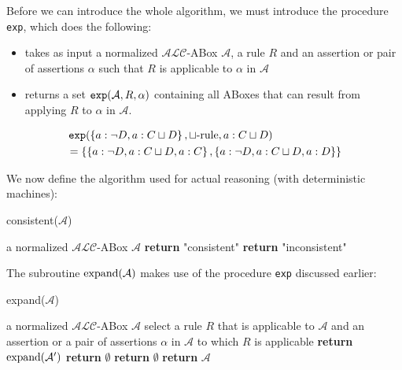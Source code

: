 Before we can introduce the whole algorithm, we must introduce the procedure \texttt{exp}, which does the following:
\begin{itemize}
	\item takes as input a normalized $\mathcal{ALC}$-ABox $\mathcal{A}$, a rule $R$ and an assertion or pair of assertions $\alpha$
		such that $R$ is applicable to $\alpha$ in  $\mathcal{A}$
	\item returns a set $\operatorname{\text{\texttt{exp}}}(\mathcal{A},R,\alpha)$ containing all  ABoxes that can result from applying $R$ to $\alpha$ in $\mathcal{A}$.
\end{itemize}
\begin{example}
	\[
	\begin{split}
		&\func{\texttt{exp}}(\left\{ a : \neg D, a : C \sqcup D \right\}, \sqcup \text{-rule}, a : C \sqcup D) \\
		&= \left\{ \left\{  a : \neg D, a : C \sqcup D, a : C\right\}, \left\{  a : \neg D, a : C \sqcup D, a : D\right\} \right\}
	\end{split}
	\]
\end{example}

\begin{definition}
	We now define the algorithm used for actual reasoning (with deterministic machines):
	\begin{algorithm}[H]
		\caption{consistent($\mathcal{A}$)}
		\label{alg:abox consistent}
		\begin{algorithmic}[1]
			\Require a normalized $\mathcal{ALC}$-ABox $\mathcal{A}$
				\State \textbf{return} "consistent"
			\Else{}
				\State \textbf{return} "inconsistent"
			\EndIf
		\end{algorithmic}
	\end{algorithm}
	The subroutine $\operatorname{\text{expand}}(\mathcal{A})$ makes use of the procedure \texttt{exp} discussed earlier:
	\begin{algorithm}[H]
		\caption{expand($\mathcal{A}$)}
		\label{alg:abox expand}
		\begin{algorithmic}[1]
			\Require a normalized $\mathcal{ALC}$-ABox $\mathcal{A}$ 
				\State select a rule $R$ that is applicable to $\mathcal{A}$ and an assertion or 
				\State a pair of assertions $\alpha$ in $\mathcal{A}$ to which $R$ is applicable
					\State \textbf{return} $\operatorname{\text{expand}}(\mathcal{A}')$
				\Else
						\State \textbf{return} $\emptyset$
				\EndIf
			\Else
					\State \textbf{return} $\emptyset$
				\Else
					\State \textbf{return} $\mathcal{A}$
				\EndIf
			\EndIf
		\end{algorithmic}
	\end{algorithm}
\end{definition}


